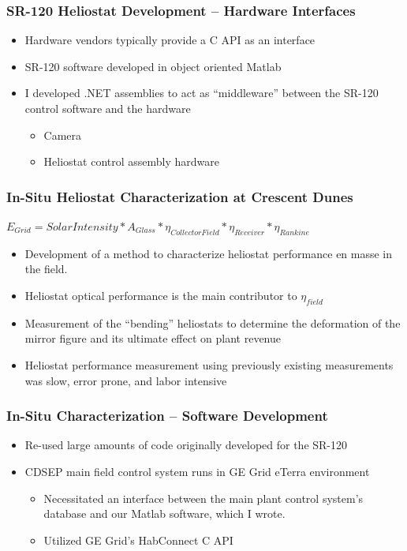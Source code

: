 \documentclass[aspectratio=169]{beamer}
\begin{document}
\begin{frame}
  \frametitle{SR-120 Heliostat Development -- Hardware Interfaces}
    \begin{itemize}
    \item Hardware vendors typically provide a C API as an interface
    \item SR-120 software developed in object oriented Matlab
    \item I developed .NET assemblies to act as ``middleware'' between the SR-120 control software and the hardware
      \begin{itemize}
        \item Camera
        \item Heliostat control assembly hardware
      \end{itemize}
  \end{itemize}
\end{frame}

\begin{frame}
  \frametitle{In-Situ Heliostat Characterization at Crescent Dunes}
      $E_{Grid}= SolarIntensity * A_{Glass} * \eta_{CollectorField} * \eta_{Receiver} * \eta_{Rankine}$
  \begin{itemize}
  \item Development of a method to characterize heliostat performance en masse in the field.
  \item Heliostat optical performance is the main contributor to $\eta_{field}$
  \item Measurement of the ``bending'' heliostats to determine the deformation of the mirror figure and its ultimate effect on plant revenue
  \item Heliostat performance measurement using previously existing measurements was slow, error prone, and labor intensive
  \end{itemize}
\end{frame}

\begin{frame}
  \frametitle{In-Situ Characterization -- Software Development}
  \begin{itemize}
  \item Re-used large amounts of code originally developed for the SR-120
  \item CDSEP main field control system runs in GE Grid eTerra environment
    \begin{itemize}
    \item Necessitated an interface between the main plant control system's database and our Matlab software, which I wrote.
    \item Utilized GE Grid's HabConnect C API
    \end{itemize}
  \end{itemize}
\end{frame}
\end{document}
